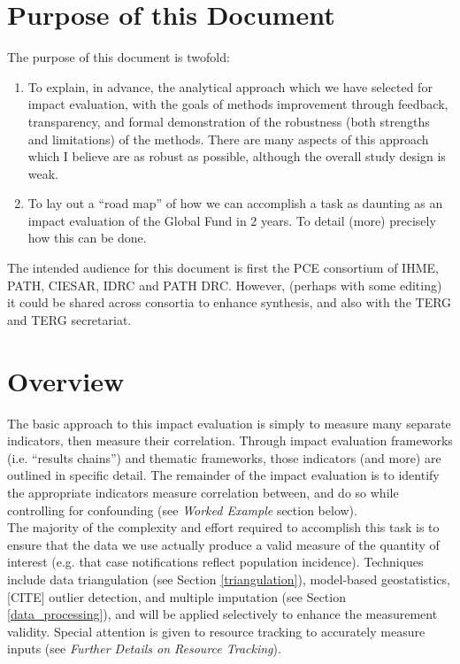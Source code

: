 \documentclass[twocolumn]{bmcart}%
\begin{document}
\section{Purpose of this Document}
The purpose of this document is twofold:

\begin{enumerate}
  \item To explain, in advance, the analytical approach which we have selected for impact evaluation, with the goals of methods improvement through feedback, transparency, and formal demonstration of the robustness (both strengths and limitations) of the methods. There are many aspects of this approach which I believe are as robust as possible, although the overall study design is weak.
  \item To lay out a ``road map'' of how we can accomplish a task as daunting as an impact evaluation of the Global Fund in 2 years. To detail (more) precisely how this can be done.\\
\end{enumerate}

The intended audience for this document is first the PCE consortium of IHME, PATH, CIESAR, IDRC and PATH DRC. However, (perhaps with some editing) it could be shared across consortia to enhance synthesis, and also with the TERG and TERG secretariat.

\section{Overview}
The basic approach to this impact evaluation is simply to measure many separate indicators, then measure their correlation. Through impact evaluation frameworks (i.e. ``results chains'') and thematic frameworks, those indicators (and more) are outlined in specific detail. The remainder of the impact evaluation is to identify the appropriate indicators measure correlation between, and do so while controlling for confounding (see \textit{Worked Example} section below). \\

The majority of the complexity and effort required to accomplish this task is to ensure that the data we use actually produce a valid measure of the quantity of interest (e.g. that case notifications reflect population incidence). Techniques include data triangulation (see Section \ref{triangulation}), model-based geostatistics,[CITE] outlier detection, and multiple imputation (see Section \ref{data_processing}), and will be applied selectively to enhance the measurement validity. Special attention is given to resource tracking to accurately measure inputs (see \textit{Further Details on Resource Tracking}).  \\
\end{document}
